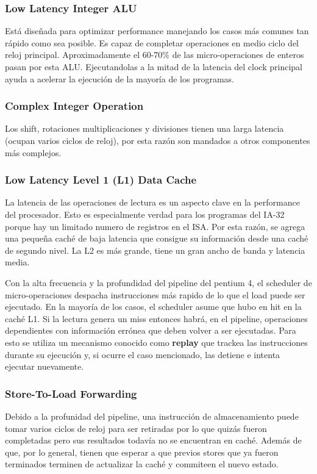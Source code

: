 \subsubsection*{Low Latency Integer ALU}
Está diseñada para optimizar performance manejando los casos más comunes tan rápido como sea posible. Es capaz de completar operaciones en medio ciclo del reloj principal. Aproximadamente el 60-70\% de las micro-operaciones de enteros pasan por esta ALU. Ejecutandolas a la mitad de la latencia del clock principal ayuda a acelerar la ejecución de la mayoría de los programas.

\subsubsection*{Complex Integer Operation}
Los shift, rotaciones multiplicaciones y divisiones tienen una larga latencia (ocupan varios ciclos de reloj), por esta razón son mandados a otros componentes más complejos. 

\subsubsection*{Low Latency Level 1 (L1) Data Cache}
La latencia de las operaciones de lectura es un aspecto clave en la performance del procesador. Esto es especialmente verdad para los programas del IA-32 porque hay un limitado numero de registros en el ISA. Por esta razón, se agrega una pequeña caché de baja latencia que consigue su información desde una caché de segundo nivel. La L2 es más grande, tiene un gran ancho de banda y latencia media.

Con la alta frecuencia y la profundidad del pipeline del pentium 4, el scheduler de micro-operaciones despacha instrucciones más rapido de lo que el load puede ser ejecutado. En la mayoría de los casos, el scheduler asume que hubo en hit en la caché L1. Si la lectura genera un miss entonces habrá, en el pipeline, operaciones dependientes con información errónea que deben volver a ser ejecutadas. Para esto se utiliza un mecanismo conocido como \textbf{replay} que trackea las instrucciones durante su ejecución y, si ocurre el caso mencionado, las detiene e intenta ejecutar nuevamente. 

\subsubsection*{Store-To-Load Forwarding}
Debido a la profunidad del pipeline, una instrucción de almacenamiento puede tomar varios ciclos de reloj para ser retiradas por lo que quizás fueron completadas pero sus resultados todavía no se encuentran en caché. Además de que, por lo general, tienen que esperar a que previos stores que ya fueron terminados terminen de actualizar la caché y commiteen el nuevo estado.
 
